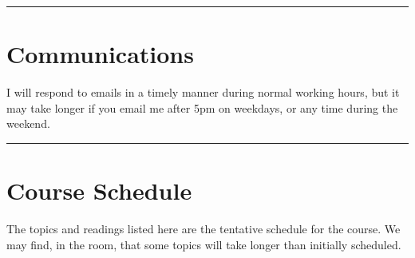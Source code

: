 \documentclass[
  letterpaper,
  DIV=11,
  numbers=noendperiod]{scrartcl}
\begin{document}
\begin{center}\rule{0.5\linewidth}{0.5pt}\end{center}

\hypertarget{communications}{%
\section{Communications}\label{communications}}

I will respond to emails in a timely manner during normal working hours,
but it may take longer if you email me after 5pm on weekdays, or any
time during the weekend.

\begin{center}\rule{0.5\linewidth}{0.5pt}\end{center}

\hypertarget{course-schedule}{%
\section{Course Schedule}\label{course-schedule}}

The topics and readings listed here are the tentative schedule for the
course. We may find, in the room, that some topics will take longer than
initially scheduled.

\footnotesize
\end{document}
